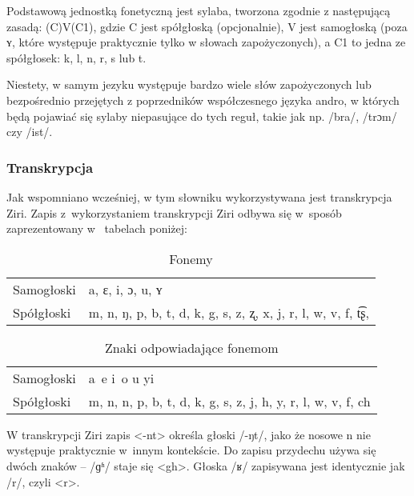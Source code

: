 \begin{spacing}{1.1}
Podstawową jednostką fonetyczną jest sylaba, tworzona zgodnie z następującą
zasadą: (C)V(C1), gdzie C jest spółgłoską (opcjonalnie), V jest samogłoską (poza
ʏ, które występuje praktycznie tylko w słowach zapożyczonych), a C1 to jedna
ze spółgłosek: k, l, n, r, s lub t.

Niestety, w samym jezyku występuje bardzo wiele słów zapożyczonych lub bezpośrednio
przejętych z poprzedników współczesnego języka andro, w których będą pojawiać
się sylaby niepasujące do tych reguł, takie jak np. /bra/, /trɔm/ czy /ist/.

\subsubsection{Transkrypcja}

Jak wspomniano wcześniej, w tym słowniku wykorzystywana jest transkrypcja Ziri. 
Zapis z~wykorzystaniem transkrypcji Ziri odbywa się w~sposób zaprezentowany w~
tabelach poniżej:

\begin{table}[ht]
	\centering
	\caption{Fonemy}
	\begin{tabular}{ll} \toprule
		Samogłoski & a, ɛ, i, ɔ, u, ʏ \\
		Spółgłoski & m, n, ŋ, p, b, t, d, k, g, s, z, ʐ, x, j, r, l, w, v, f, t͡ʂ, \\\bottomrule
	\end{tabular}
	\label{tab:phonemes}
\end{table}

\begin{table}[ht]
\centering
\caption{Znaki odpowiadające fonemom}
\begin{tabular}{ll} \toprule
	Samogłoski & a~e i~o u yi \\
	Spółgłoski & m, n, n, p, b, t, d, k, g, s, z, j, h, y, r, l, w, v, f, ch \\\bottomrule
\end{tabular}
\label{tab:chars}
\end{table}

W transkrypcji Ziri zapis <-nt> określa głoski /-ŋt/, jako że nosowe n nie 
występuje praktycznie w~innym kontekście. Do zapisu przydechu używa się dwóch 
znaków -- /ɡʱ/ staje się <gh>. Głoska /ʁ/ zapisywana jest identycznie jak /r/, 
czyli <r>.

\skipline


\end{spacing}
